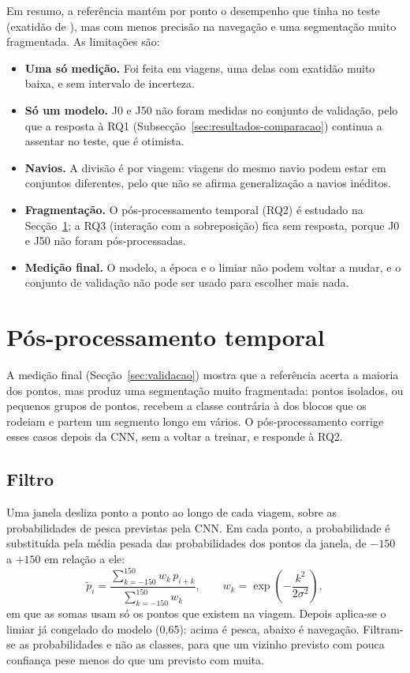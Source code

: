 \documentclass{article}
\newcommand{\revtext}[2]{{\color{#1}#2}}
\begin{document}
\revtext{rev053}{Em resumo, a referência mantém por ponto o desempenho que tinha no teste (exatidão de \resVaValidAcc{}), mas com menos precisão na navegação e uma segmentação muito fragmentada. As limitações são:
\begin{itemize}
\item \textbf{Uma só medição.} Foi feita em \resVaViagens{} viagens, uma delas com exatidão muito baixa, e sem intervalo de incerteza.
\item \textbf{Só um modelo.} J0 e J50 não foram medidas no conjunto de validação, pelo que a resposta à RQ1 (Subsecção~\ref{sec:resultados-comparacao}) continua a assentar no teste, que é otimista.
\item \textbf{Navios.} A divisão é por viagem: viagens do mesmo navio podem estar em conjuntos diferentes, pelo que não se afirma generalização a navios inéditos.
\item \textbf{Fragmentação.} \revtext{rev057}{O pós-processamento temporal (RQ2) é estudado na Secção~\ref{sec:posproc}; a RQ3 (interação com a sobreposição) fica sem resposta, porque J0 e J50 não foram pós-processadas.}
\item \textbf{Medição final.} O modelo, a época e o limiar não podem voltar a mudar, e o conjunto de validação não pode ser usado para escolher mais nada.
\end{itemize}}

\section{\texorpdfstring{\revtext{rev056}{Pós-processamento temporal}}{Pós-processamento temporal}}
\label{sec:posproc}

\revtext{rev056}{A medição final (Secção~\ref{sec:validacao}) mostra que a referência acerta a maioria dos pontos, mas produz uma segmentação muito fragmentada: pontos isolados, ou pequenos grupos de pontos, recebem a classe contrária à dos blocos que os rodeiam e partem um segmento longo em vários. O pós-processamento corrige esses casos depois da CNN, sem a voltar a treinar, e responde à RQ2.}

\subsection{\texorpdfstring{\revtext{rev056}{Filtro}}{Filtro}}

\revtext{rev056}{Uma janela desliza ponto a ponto ao longo de cada viagem, sobre as probabilidades de pesca previstas pela CNN. Em cada ponto, a probabilidade é substituída pela média pesada das probabilidades dos pontos da janela, \revtext{rev059}{de $-150$ a $+150$} em relação a ele:
\[
\tilde{p}_i=\frac{\sum_{k=-150}^{150} w_k\,p_{i+k}}{\sum_{k=-150}^{150} w_k},\qquad w_k=\exp\!\left(-\frac{k^2}{2\sigma^2}\right),
\]
em que as somas usam só os pontos que existem na viagem. Depois aplica-se o limiar já congelado do modelo (0,65): acima é pesca, abaixo é navegação. Filtram-se as probabilidades e não as classes, para que um vizinho previsto com pouca confiança pese menos do que um previsto com muita.}
\end{document}
